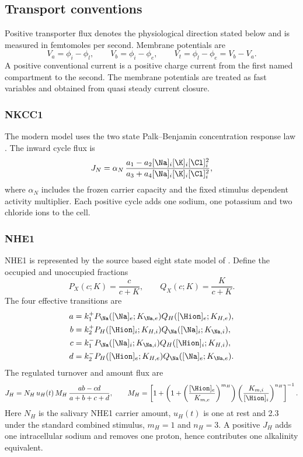 \subsection{Transport conventions}

Positive transporter flux denotes the physiological direction stated below and is measured in femtomoles per second. Membrane potentials are
\[
V_a=\phi_i-\phi_l,\qquad V_b=\phi_i-\phi_e,\qquad V_t=\phi_l-\phi_e=V_b-V_a.
\]
A positive conventional current is a positive charge current from the first named compartment to the second. The membrane potentials are treated as fast variables and obtained from quasi steady current closure.

\subsubsection{NKCC1}

The modern model uses the two state Palk--Benjamin concentration response law \citep{Benjamin1997,Palk2010}. The inward cycle flux is
\begin{equation}
\label{eq:nkcc1}
J_N=\alpha_{N}\,
\frac{a_1-a_2[\Na]_i[\K]_i[\Cl]_i^2}
     {a_3+a_4[\Na]_i[\K]_i[\Cl]_i^2},
\end{equation}
where $\alpha_N$ includes the frozen carrier capacity and the fixed stimulus dependent activity multiplier. Each positive cycle adds one sodium, one potassium and two chloride ions to the cell.

\subsubsection{NHE1}

NHE1 is represented by the source based eight state model of \citet{Cha2009}. Define the occupied and unoccupied fractions
\[
P_X(c;K)=\frac{c}{c+K},\qquad Q_X(c;K)=\frac{K}{c+K}.
\]
The four effective transitions are
\begin{align*}
a&=k_1^+P_{\Na}([\Na]_e;K_{\Na,e})Q_H([\Hion]_e;K_{H,e}),\\
b&=k_2^+P_H([\Hion]_i;K_{H,i})Q_{\Na}([\Na]_i;K_{\Na,i}),\\
c&=k_1^-P_{\Na}([\Na]_i;K_{\Na,i})Q_H([\Hion]_i;K_{H,i}),\\
d&=k_2^-P_H([\Hion]_e;K_{H,e})Q_{\Na}([\Na]_e;K_{\Na,e}).
\end{align*}
The regulated turnover and amount flux are
\begin{equation}
\label{eq:nhe1}
J_H=N_H\,u_H(t)\,M_H\,\frac{ab-cd}{a+b+c+d},
\qquad
M_H=\left[1+\left(1+\left(\frac{[\Hion]_e}{K_{m,e}}\right)^{m_H}\right)
\left(\frac{K_{m,i}}{[\Hion]_i}\right)^{n_H}\right]^{-1}.
\end{equation}
Here $N_H$ is the salivary NHE1 carrier amount, $u_H(t)$ is one at rest and 2.3 under the standard combined stimulus, $m_H=1$ and $n_H=3$. A positive $J_H$ adds one intracellular sodium and removes one proton, hence contributes one alkalinity equivalent.

